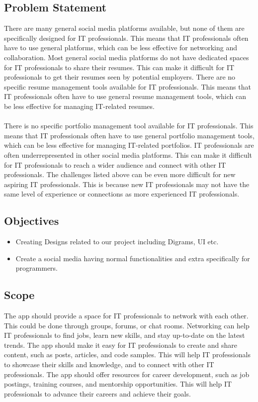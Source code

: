 \documentclass[12pt]{article}
\begin{document}
\subsection{Problem Statement}


There are many general social media platforms available, but none of them are specifically designed for IT professionals. This means that IT professionals often have to use general platforms, which can be less effective for networking and collaboration.
Most general social media platforms do not have dedicated spaces for IT professionals to share their resumes. This can make it difficult for IT professionals to get their resumes seen by potential employers.
There are no specific resume management tools available for IT professionals. This means that IT professionals often have to use general resume management tools, which can be less effective for managing IT-related resumes.\\\\
There is no specific portfolio management tool available for IT professionals. This means that IT professionals often have to use general portfolio management tools, which can be less effective for managing IT-related portfolios.
IT professionals are often underrepresented in other social media platforms. This can make it difficult for IT professionals to reach a wider audience and connect with other IT professionals.
The challenges listed above can be even more difficult for new aspiring IT professionals. This is because new IT professionals may not have the same level of experience or connections as more experienced IT professionals.

\subsection{Objectives}
\begin{itemize}
    \item Creating Designs related to our project including Digrams, UI etc.
    \item Create a social media having normal functionalities and extra specifically  for programmers.
\end{itemize}
\subsection{Scope}

The app should provide a space for IT professionals to network with each other. This could be done through groups, forums, or chat rooms. Networking can help IT professionals to find jobs, learn new skills, and stay up-to-date on the latest trends.
The app should make it easy for IT professionals to create and share content, such as posts, articles, and code samples. This will help IT professionals to showcase their skills and knowledge, and to connect with other IT professionals.
The app should offer resources for career development, such as job postings, training courses, and mentorship opportunities. This will help IT professionals to advance their careers and achieve their goals.
\end{document}
